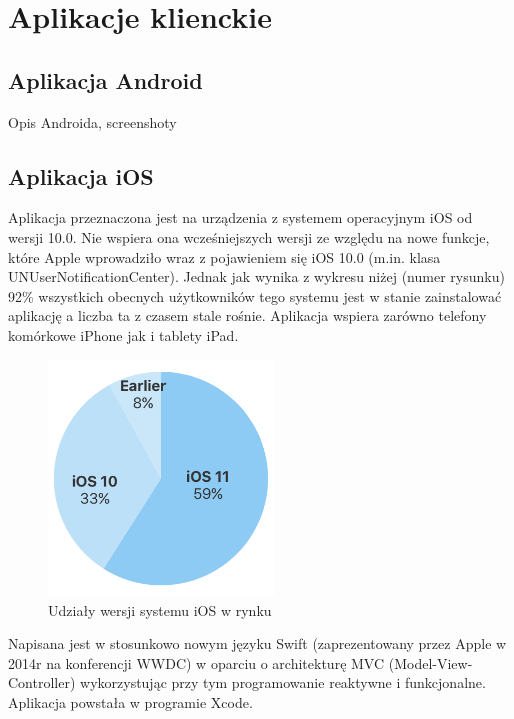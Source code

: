 \chapter{Aplikacje klienckie}

\section*{Aplikacja Android}

Opis Androida, screenshoty
\section*{Aplikacja iOS}
Aplikacja przeznaczona jest na urządzenia z systemem operacyjnym iOS od wersji 10.0. 
Nie wspiera ona wcześniejszych wersji ze względu na nowe funkcje, które Apple wprowadziło wraz z pojawieniem się iOS 10.0 (m.in. klasa UNUserNotificationCenter). Jednak jak wynika z wykresu niżej (numer rysunku) 92\% wszystkich obecnych użytkowników tego systemu jest w stanie zainstalować aplikację a liczba ta z czasem stale rośnie. Aplikacja wspiera zarówno telefony komórkowe iPhone jak i tablety iPad. 
\begin{figure}[h]
	\centering
	\includegraphics[width=6cm]{iOSstat}
	\caption{Udziały wersji systemu iOS w rynku}
\end{figure}
Napisana jest w stosunkowo nowym języku Swift (zaprezentowany przez Apple w 2014r na konferencji WWDC) w oparciu o architekturę MVC (Model-View-Controller) wykorzystując przy tym programowanie reaktywne i funkcjonalne. Aplikacja powstała w programie Xcode.
